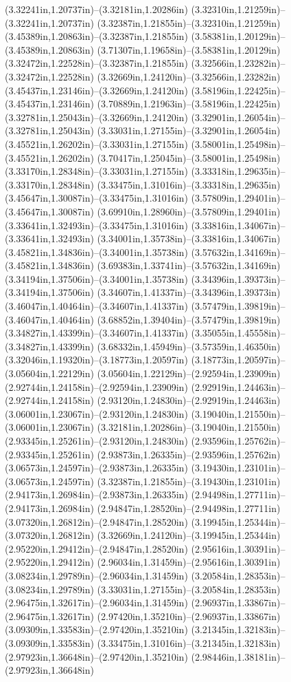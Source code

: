 (3.32241in,1.20737in)--(3.32181in,1.20286in) (3.32310in,1.21259in)--(3.32241in,1.20737in) (3.32387in,1.21855in)--(3.32310in,1.21259in) (3.45389in,1.20863in)--(3.32387in,1.21855in) (3.58381in,1.20129in)--(3.45389in,1.20863in) (3.71307in,1.19658in)--(3.58381in,1.20129in) (3.32472in,1.22528in)--(3.32387in,1.21855in) (3.32566in,1.23282in)--(3.32472in,1.22528in) (3.32669in,1.24120in)--(3.32566in,1.23282in) (3.45437in,1.23146in)--(3.32669in,1.24120in) (3.58196in,1.22425in)--(3.45437in,1.23146in) (3.70889in,1.21963in)--(3.58196in,1.22425in) (3.32781in,1.25043in)--(3.32669in,1.24120in) (3.32901in,1.26054in)--(3.32781in,1.25043in) (3.33031in,1.27155in)--(3.32901in,1.26054in) (3.45521in,1.26202in)--(3.33031in,1.27155in) (3.58001in,1.25498in)--(3.45521in,1.26202in) (3.70417in,1.25045in)--(3.58001in,1.25498in) (3.33170in,1.28348in)--(3.33031in,1.27155in) (3.33318in,1.29635in)--(3.33170in,1.28348in) (3.33475in,1.31016in)--(3.33318in,1.29635in) (3.45647in,1.30087in)--(3.33475in,1.31016in) (3.57809in,1.29401in)--(3.45647in,1.30087in) (3.69910in,1.28960in)--(3.57809in,1.29401in) (3.33641in,1.32493in)--(3.33475in,1.31016in) (3.33816in,1.34067in)--(3.33641in,1.32493in) (3.34001in,1.35738in)--(3.33816in,1.34067in) (3.45821in,1.34836in)--(3.34001in,1.35738in) (3.57632in,1.34169in)--(3.45821in,1.34836in) (3.69383in,1.33741in)--(3.57632in,1.34169in) (3.34194in,1.37506in)--(3.34001in,1.35738in) (3.34396in,1.39373in)--(3.34194in,1.37506in) (3.34607in,1.41337in)--(3.34396in,1.39373in) (3.46047in,1.40464in)--(3.34607in,1.41337in) (3.57479in,1.39819in)--(3.46047in,1.40464in) (3.68852in,1.39404in)--(3.57479in,1.39819in) (3.34827in,1.43399in)--(3.34607in,1.41337in) (3.35055in,1.45558in)--(3.34827in,1.43399in) (3.68332in,1.45949in)--(3.57359in,1.46350in) (3.32046in,1.19320in)--(3.18773in,1.20597in) (3.18773in,1.20597in)--(3.05604in,1.22129in) (3.05604in,1.22129in)--(2.92594in,1.23909in) (2.92744in,1.24158in)--(2.92594in,1.23909in) (2.92919in,1.24463in)--(2.92744in,1.24158in) (2.93120in,1.24830in)--(2.92919in,1.24463in) (3.06001in,1.23067in)--(2.93120in,1.24830in) (3.19040in,1.21550in)--(3.06001in,1.23067in) (3.32181in,1.20286in)--(3.19040in,1.21550in) (2.93345in,1.25261in)--(2.93120in,1.24830in) (2.93596in,1.25762in)--(2.93345in,1.25261in) (2.93873in,1.26335in)--(2.93596in,1.25762in) (3.06573in,1.24597in)--(2.93873in,1.26335in) (3.19430in,1.23101in)--(3.06573in,1.24597in) (3.32387in,1.21855in)--(3.19430in,1.23101in) (2.94173in,1.26984in)--(2.93873in,1.26335in) (2.94498in,1.27711in)--(2.94173in,1.26984in) (2.94847in,1.28520in)--(2.94498in,1.27711in) (3.07320in,1.26812in)--(2.94847in,1.28520in) (3.19945in,1.25344in)--(3.07320in,1.26812in) (3.32669in,1.24120in)--(3.19945in,1.25344in) (2.95220in,1.29412in)--(2.94847in,1.28520in) (2.95616in,1.30391in)--(2.95220in,1.29412in) (2.96034in,1.31459in)--(2.95616in,1.30391in) (3.08234in,1.29789in)--(2.96034in,1.31459in) (3.20584in,1.28353in)--(3.08234in,1.29789in) (3.33031in,1.27155in)--(3.20584in,1.28353in) (2.96475in,1.32617in)--(2.96034in,1.31459in) (2.96937in,1.33867in)--(2.96475in,1.32617in) (2.97420in,1.35210in)--(2.96937in,1.33867in) (3.09309in,1.33583in)--(2.97420in,1.35210in) (3.21345in,1.32183in)--(3.09309in,1.33583in) (3.33475in,1.31016in)--(3.21345in,1.32183in) (2.97923in,1.36648in)--(2.97420in,1.35210in) (2.98446in,1.38181in)--(2.97923in,1.36648in) 